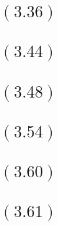 \documentclass[letterpaper,12pt,titlepage]{article}
\begin{document}
\section*{$(3.36)$}
\begin{mdframed}[style=MyFrame]
\end{mdframed} 

\section*{$(3.44)$} 
\begin{mdframed}[style=MyFrame]
\end{mdframed}

\section*{$(3.48)$}
\begin{mdframed}[style=MyFrame]
\end{mdframed} 

\section*{$(3.54)$} 
\begin{mdframed}[style=MyFrame]
\end{mdframed} 

\section*{$(3.60)$} 
\begin{mdframed}[style=MyFrame]
\end{mdframed}

\section*{$(3.61)$} 
\begin{mdframed}[style=MyFrame]
\end{mdframed}

%




\end{document}
